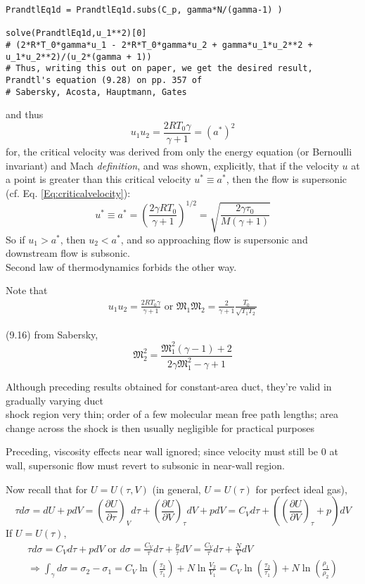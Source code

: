 \documentclass[twoside,landscape,10pt]{amsart}
\theoremstyle{plain}
\theoremstyle{definition}
\theoremstyle{remark}
\theoremstyle{remark}
\begin{document}
\begin{multicols*}{2}
\begin{lstlisting}
PrandtlEq1d = PrandtlEq1d.subs(C_p, gamma*N/(gamma-1) )

solve(PrandtlEq1d,u_1**2)[0]
# (2*R*T_0*gamma*u_1 - 2*R*T_0*gamma*u_2 + gamma*u_1*u_2**2 + u_1*u_2**2)/(u_2*(gamma + 1))
# Thus, writing this out on paper, we get the desired result, Prandtl's equation (9.28) on pp. 357 of 
# Sabersky, Acosta, Hauptmann, Gates
\end{lstlisting}
and thus
\[
u_1u_2 = \frac{2RT_0\gamma}{\gamma +1} = (a^*)^2
\]
for, the critical velocity was derived from only the energy equation (or Bernoulli invariant) and Mach \emph{definition}, and was shown, explicitly, that if the velocity $u$ at a point is greater than this critical velocity $u^*\equiv a^*$, then the flow is supersonic (cf. Eq. \ref{Eq:criticalvelocity}):
\[
u^* \equiv a^*  = \left( \frac{2\gamma RT_0 }{ \gamma + 1 } \right)^{1/2} = \sqrt{ \frac{2\gamma \tau_0}{M(\gamma +1) } }
\]
So if $u_1 > a^*$, then $u_2 < a^*$, and so approaching flow is supersonic and downstream flow is subsonic.   \\
Second law of thermodynamics forbids the other way.

Note that 
\[
\begin{gathered}
  u_1 u_2 = \frac{2RT_0 \gamma }{ \gamma +1} \text{ or } \mathfrak{M}_1\mathfrak{M}_2 = \frac{2}{\gamma +1} \frac{T_0 }{\sqrt{ T_1 T_2 }}
\end{gathered}
\]

(9.16) from Sabersky,
\begin{equation}
  \boxed{ \mathfrak{M}_2^2 = \frac{ \mathfrak{M}_1^2 (\gamma -1) + 2 }{ 2\gamma \mathfrak{M}_1^2 - \gamma + 1 } }
\end{equation}

Although preceding results obtained for constant-area duct, they're valid in gradually varying duct \\
\phantom{Although} shock region very thin; order of a few molecular mean free path lengths; area change across the shock is then usually negligible for practical purposes

Preceding, viscosity effects near wall ignored; since velocity must still be $0$ at wall, supersonic flow must revert to subsonic in near-wall region.\cite{SAHG1998}



Now recall that for $U=U(\tau,V)$ (in general, $U=U(\tau)$ for perfect ideal gas), 
\[
\tau d\sigma = dU + pdV = \left( \frac{ \partial U}{ \partial \tau} \right)_V d\tau + \left( \frac{ \partial U}{ \partial V} \right)_{\tau} dV + pdV = C_V d\tau + \left( \left( \frac{ \partial U}{ \partial V} \right)_{\tau} + p \right) dV
\]
If $U=U(\tau)$, 
\[
\begin{gathered}
  \tau d\sigma = C_V d\tau + p dV \text{ or } d\sigma = \frac{C_V}{\tau} d\tau + \frac{p}{\tau} dV = \frac{C_V}{\tau} d\tau + \frac{N}{V} dV  \\
  \Longrightarrow \int_{\gamma} d\sigma = \sigma_2 - \sigma_1 = C_V \ln{ \left( \frac{\tau_2}{\tau_1} \right) } + N \ln{\frac{ V_2}{V_1}} = C_V \ln{ \left( \frac{\tau_2}{\tau_1} \right) } + N\ln{ \left( \frac{\rho_1}{\rho_2} \right) }
\end{gathered}
\]



\end{multicols*}
\end{document}
